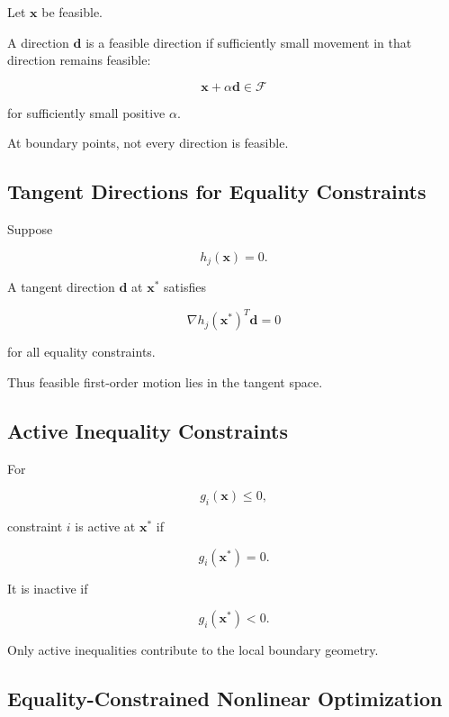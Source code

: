 Let \(\mathbf{x}\) be feasible.

A direction \(\mathbf{d}\) is a feasible direction if sufficiently small
movement in that direction remains feasible:

\[
\boxed{
\mathbf{x}
+
\alpha\mathbf{d}
\in
\mathcal{F}
}
\]

for sufficiently small positive \(\alpha\).

At boundary points, not every direction is feasible.

\subsection{Tangent Directions for Equality Constraints}
\label{subsec:nlp-tangent-directions}

Suppose

\[
h_j(\mathbf{x})=0.
\]

A tangent direction \(\mathbf{d}\) at \(\mathbf{x}^*\) satisfies

\[
\boxed{
\nabla h_j(\mathbf{x}^*)^T
\mathbf{d}
=
0
}
\]

for all equality constraints.

Thus feasible first-order motion lies in the tangent space.

\subsection{Active Inequality Constraints}
\label{subsec:nlp-active-constraints}

For

\[
g_i(\mathbf{x})\leq0,
\]

constraint \(i\) is active at \(\mathbf{x}^*\) if

\[
\boxed{
g_i(\mathbf{x}^*)=0.
}
\]

It is inactive if

\[
\boxed{
g_i(\mathbf{x}^*)<0.
}
\]

Only active inequalities contribute to the local boundary geometry.

\subsection{Equality-Constrained Nonlinear Optimization}
\label{subsec:nlp-equality-constrained}

